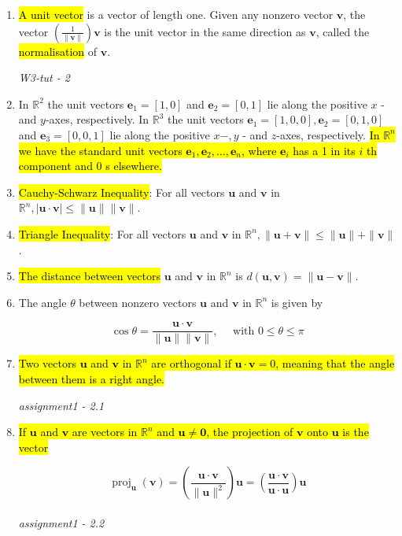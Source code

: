 \documentclass[10pt]{article}
\begin{document}
\begin{enumerate}
\item \hl{A unit vector} is a vector of length one. Given any nonzero vector $\mathbf{v}$, the vector $\left(\frac{1}{\|\mathbf{v}\|}\right) \mathbf{v}$ is the unit vector in the same direction as $\mathbf{v}$, called the \hl{normalisation} of $\mathbf{v}$.

\textit{W3-tut - 2}

\item In $\mathbb{R}^{2}$ the unit vectors $\mathbf{e}_{1}=[1,0]$ and $\mathbf{e}_{2}=[0,1]$ lie along the positive $x$ - and $y$-axes, respectively. In $\mathbb{R}^{3}$ the unit vectors $\mathbf{e}_{1}=[1,0,0], \mathbf{e}_{2}=[0,1,0]$ and $\mathbf{e}_{3}=[0,0,1]$ lie along the positive $x-, y$ - and $z$-axes, respectively. \hl{In $\mathbb{R}^{n}$ we have the standard unit vectors $\mathbf{e}_{1}, \mathbf{e}_{2}, \ldots, \mathbf{e}_{n}$, where $\mathbf{e}_{i}$ has a 1 in its $i$ th component and 0 s elsewhere.}


\item \hl{Cauchy-Schwarz Inequality}: For all vectors $\mathbf{u}$ and $\mathbf{v}$ in $\mathbb{R}^{n},|\mathbf{u} \cdot \mathbf{v}| \leq\|\mathbf{u}\|\|\mathbf{v}\|$.

\item \hl{Triangle Inequality}: For all vectors $\mathbf{u}$ and $\mathbf{v}$ in $\mathbb{R}^{n},\|\mathbf{u}+\mathbf{v}\| \leq\|\mathbf{u}\|+\|\mathbf{v}\|$.

\item \hl{The distance between vectors} $\mathbf{u}$ and $\mathbf{v}$ in $\mathbb{R}^{n}$ is $d(\mathbf{u}, \mathbf{v})=\|\mathbf{u}-\mathbf{v}\|$.

\item The angle $\theta$ between nonzero vectors $\mathbf{u}$ and $\mathbf{v}$ in $\mathbb{R}^{n}$ is given by

$$
\cos \theta=\frac{\mathbf{u} \cdot \mathbf{v}}{\|\mathbf{u}\|\|\mathbf{v}\|}, \quad \text { with } 0 \leq \theta \leq \pi
$$

\item \hl{Two vectors $\mathbf{u}$ and $\mathbf{v}$ in $\mathbb{R}^{n}$ are orthogonal if $\mathbf{u} \cdot \mathbf{v}=0$, meaning that the angle between them is a right angle.}

\textit{assignment1 - 2.1}

\item \hl{If $\mathbf{u}$ and $\mathbf{v}$ are vectors in $\mathbb{R}^{n}$ and $\mathbf{u} \neq \mathbf{0}$, the projection of $\mathbf{v}$ onto $\mathbf{u}$ is the vector}

$$
\operatorname{proj}_{\mathbf{u}}(\mathbf{v})=\left(\frac{\mathbf{u} \cdot \mathbf{v}}{\|\mathbf{u}\|^{2}}\right) \mathbf{u}=\left(\frac{\mathbf{u} \cdot \mathbf{v}}{\mathbf{u} \cdot \mathbf{u}}\right) \mathbf{u}
$$
\\
\textit{assignment1 - 2.2}



\newpage






\end{enumerate}
\end{document}
